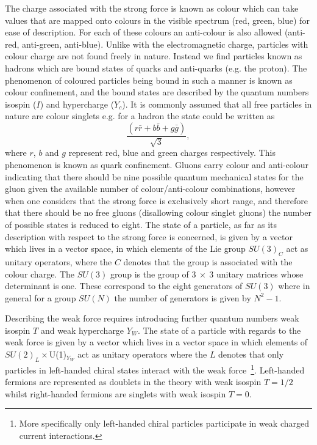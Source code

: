 The charge associated with the strong force is known as colour which can take
values that are mapped onto colours in the visible spectrum (red, green, blue)
for ease of description. For each of these colours an anti-colour is also
allowed (anti-red, anti-green, anti-blue). Unlike with the electromagnetic
charge, particles with colour charge are not found freely in nature. Instead we
find particles known as hadrons which are bound states of quarks and anti-quarks
(e.g. the proton). The phenomenon of coloured particles being bound in such a
manner is known as colour confinement, and the bound states are described by the
quantum numbers isospin ($I$) and hypercharge ($Y_c$). It is commonly assumed
that all free particles in nature are colour singlets e.g. for a hadron the
state could be written as
\begin{equation}
  \label{eq:hadron-colour}
  \frac{(r\bar{r} + b\bar{b} + g\bar{g})}{\sqrt{3}},
\end{equation}
where $r$, $b$ and $g$ represent red, blue and green charges respectively. This
phenomenon is known as quark confinement. Gluons carry colour and anti-colour
indicating that there should be nine possible quantum mechanical states for the
gluon given the available number of colour/anti-colour combinations, however
when one considers that the strong force is exclusively short range, and
therefore that there should be no free gluons (disallowing colour singlet
gluons) the number of possible states is reduced to eight. The state of a
particle, as far as its description with respect to the strong force is
concerned, is given by a vector which lives in a vector space, in which elements
of the Lie group $SU(3)_C$ act as unitary operators, where the $C$ denotes that
the group is associated with the colour charge. The $SU(3)$ group is the group
of $3~\times~3$ unitary matrices whose determinant is one. These correspond to
the eight generators of $SU(3)$ where in general for a group $SU(N)$ the number
of generators is given by $N^2 - 1$.

Describing the weak force requires introducing further quantum numbers weak
isospin $T$ and weak hypercharge $Y_W$. The state of a particle with regards to
the weak force is given by a vector which lives in a vector space in which
elements of $SU(2)_L \times $U(1)$_{Y_{W}}$ act as unitary operators where the
$L$ denotes that only particles in left-handed chiral states interact with the
weak force~\footnote{More specifically only left-handed chiral particles
  participate in weak charged current interactions.}. Left-handed fermions are
represented as doublets in the theory with weak isospin $T = 1/2$ whilst
right-handed fermions are singlets with weak isospin $T = 0$.

